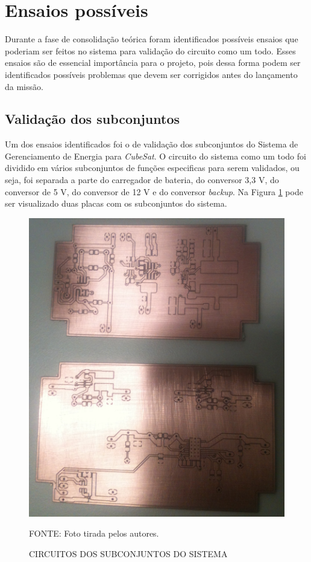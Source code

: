 \documentclass[
	12pt,				%
	openright,			%
	oneside,			%
	a4paper,			%
	english,			%
	french,				%
	spanish,			%
	brazil,				%
	oldfontcommands
	]{abntex2}
\begin{document}
\section[Ensaios possíveis]{Ensaios possíveis}
	
	Durante a fase de consolidação teórica foram identificados possíveis ensaios que poderiam ser feitos no sistema para validação do circuito como um todo. Esses ensaios são de essencial importância para o projeto, pois dessa forma podem ser identificados possíveis problemas que devem ser corrigidos antes do lançamento da missão.
	
\subsection[Validação dos subconjuntos]{Validação dos subconjuntos}

	Um dos ensaios identificados foi o de validação dos subconjuntos do Sistema de Gerenciamento de Energia para \textit{CubeSat}. O circuito do sistema como um todo foi dividido em vários subconjuntos de funções especificas para serem validados, ou seja, foi separada a parte do carregador de bateria, do conversor 3,3 V, do conversor de 5 V, do conversor de 12 V e do conversor \textit{backup}. Na Figura \ref{Fig_SubConj} pode ser visualizado duas placas com os subconjuntos do sistema.
	
	\begin{figure}[th]
		\caption{CIRCUITOS DOS SUBCONJUNTOS DO SISTEMA}
		\label{Fig_SubConj}
		\centering
		\includegraphics[width=0.7\linewidth]{./figs/placas_subconjuntos}
			
		\begin{small}
			FONTE: Foto tirada pelos autores.
		\end{small}		
	\end{figure}
	
\end{document}
